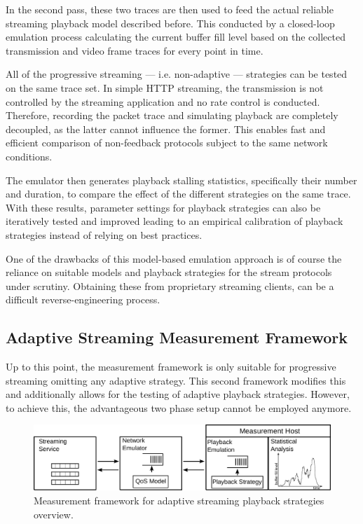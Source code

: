 In the second pass, these two traces are then used to feed the actual reliable streaming playback model described before. This conducted by a closed-loop emulation process calculating the current buffer fill level based on the collected transmission and video frame traces for every point in time. 

All of the progressive streaming --- i.e. non-adaptive --- strategies can be tested on the same trace set.
In simple \gls{HTTP} streaming, the transmission is not controlled by the streaming application and no rate control is conducted. Therefore, recording the packet trace and simulating playback are completely decoupled, as the latter cannot influence the former.  This enables fast and efficient comparison of non-feedback protocols subject to the same network conditions.

The emulator then generates playback stalling statistics, specifically their number and duration, to compare the effect of the different strategies on the same trace. With these results, parameter settings for playback strategies can also be iteratively tested and improved leading to an empirical calibration of playback strategies instead of relying on best practices.

One of the drawbacks of this model-based emulation approach is of course the reliance on suitable models and playback strategies for the stream protocols under scrutiny. Obtaining these from proprietary streaming clients, can be a difficult reverse-engineering process.


\subsection{Adaptive Streaming Measurement Framework}

Up to this point, the measurement framework is only suitable for progressive streaming omitting any adaptive strategy. This second framework modifies this and additionally allows for the testing of adaptive playback strategies. However, to achieve this, the advantageous two phase setup cannot be employed anymore.

\begin{figure}[htb]
    \includegraphics[width=\textwidth]{images/feedback-measurement-model.pdf}
    \caption{Measurement framework for adaptive streaming playback strategies overview.}
    \label{c3:fig:framework-feedback}
\end{figure}

